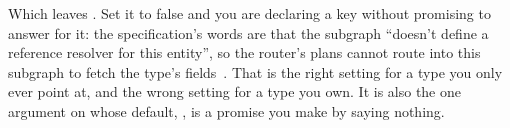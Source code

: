 %
Which leaves . Set it to false and you are declaring a key
without promising to answer for it: the specification's words are that the
subgraph \enquote{doesn't define a reference resolver for this entity}, so the
router's plans cannot route into this subgraph to fetch the type's
fields~\autocite{apollodirectives}. That is the right setting for a type you
only ever point at, and the wrong setting for a type you own. It is also the
one argument on  whose default, , is a promise you make
by saying nothing.
%
